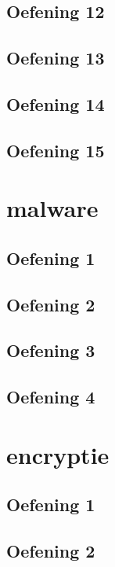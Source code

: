 \documentclass[a4paper,11pt]{report}
\begin{document}
\section{Oefening 12}

\section{Oefening 13}

\section{Oefening 14}

\section{Oefening 15}

\newpage

\chapter{malware}
\section{Oefening 1}

\section{Oefening 2}

\section{Oefening 3}

\section{Oefening 4}

\newpage

\chapter{encryptie}
\section{Oefening 1}

\section{Oefening 2}

\end{document}
